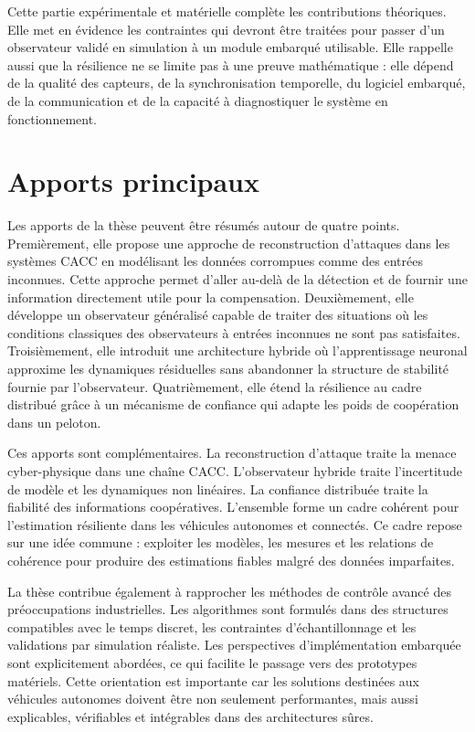 Cette partie expérimentale et matérielle complète les contributions théoriques. Elle met en évidence les contraintes qui devront être traitées pour passer d'un observateur validé en simulation à un module embarqué utilisable. Elle rappelle aussi que la résilience ne se limite pas à une preuve mathématique : elle dépend de la qualité des capteurs, de la synchronisation temporelle, du logiciel embarqué, de la communication et de la capacité à diagnostiquer le système en fonctionnement.

\section*{Apports principaux}

Les apports de la thèse peuvent être résumés autour de quatre points. Premièrement, elle propose une approche de reconstruction d'attaques dans les systèmes CACC en modélisant les données corrompues comme des entrées inconnues. Cette approche permet d'aller au-delà de la détection et de fournir une information directement utile pour la compensation. Deuxièmement, elle développe un observateur généralisé capable de traiter des situations où les conditions classiques des observateurs à entrées inconnues ne sont pas satisfaites. Troisièmement, elle introduit une architecture hybride où l'apprentissage neuronal approxime les dynamiques résiduelles sans abandonner la structure de stabilité fournie par l'observateur. Quatrièmement, elle étend la résilience au cadre distribué grâce à un mécanisme de confiance qui adapte les poids de coopération dans un peloton.

Ces apports sont complémentaires. La reconstruction d'attaque traite la menace cyber-physique dans une chaîne CACC. L'observateur hybride traite l'incertitude de modèle et les dynamiques non linéaires. La confiance distribuée traite la fiabilité des informations coopératives. L'ensemble forme un cadre cohérent pour l'estimation résiliente dans les véhicules autonomes et connectés. Ce cadre repose sur une idée commune : exploiter les modèles, les mesures et les relations de cohérence pour produire des estimations fiables malgré des données imparfaites.

La thèse contribue également à rapprocher les méthodes de contrôle avancé des préoccupations industrielles. Les algorithmes sont formulés dans des structures compatibles avec le temps discret, les contraintes d'échantillonnage et les validations par simulation réaliste. Les perspectives d'implémentation embarquée sont explicitement abordées, ce qui facilite le passage vers des prototypes matériels. Cette orientation est importante car les solutions destinées aux véhicules autonomes doivent être non seulement performantes, mais aussi explicables, vérifiables et intégrables dans des architectures sûres.

